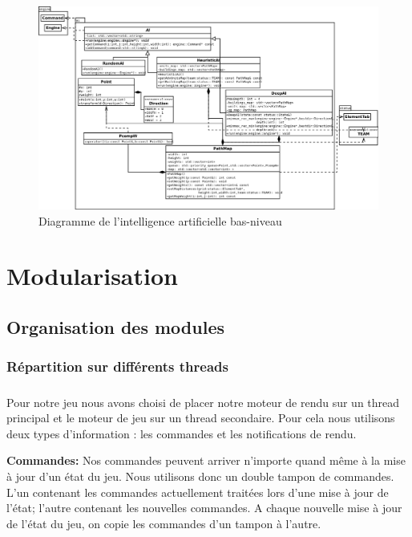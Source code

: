 \documentclass[12pt]{report}
\begin{document}
    \newpage
\thispagestyle{empty}
\begin{landscape}
\begin{figure}[h]
    \begin{center}
    \includegraphics[scale=0.45]{ai.png}
    \end{center}
    \caption{Diagramme de l'intelligence artificielle bas-niveau}
\end{figure}
\end{landscape}
\newpage

\chapter{Modularisation}
\section{Organisation des modules}
\subsection{Répartition sur différents threads}

\paragraph{}Pour notre jeu nous avons choisi de placer notre moteur de rendu sur un thread principal et le moteur de jeu sur un thread secondaire. Pour cela nous utilisons deux types d'information : les commandes et les notifications de rendu.

\paragraphe{}\textbf{Commandes:} Nos commandes peuvent arriver n'importe quand même à la mise à jour d'un état du jeu. Nous utilisons donc un double tampon de commandes. L'un contenant les commandes actuellement traitées lors d'une mise à jour de l'état; l'autre contenant les nouvelles commandes. A chaque nouvelle mise à jour de l’état du jeu, on copie les commandes d’un tampon à l’autre. 
\end{document}
